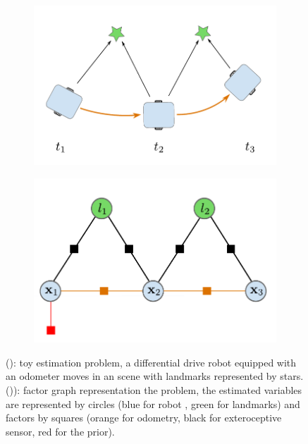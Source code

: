 \begin{figure}[h]
    \centering
    \begin{subfigure}{.49\linewidth}
        \centering
        \includegraphics[width=\textwidth]{figures/toy_example.pdf}
        \caption{\label{fig:toy_problem}}
    \end{subfigure}%
    \hfill
    \begin{subfigure}{.49\linewidth}
        \centering
        \includegraphics[width=\textwidth]{figures/toy_factor.pdf}
        \caption{\label{fig:toy_factor}}
    \end{subfigure}%
    \caption{(): toy estimation problem, a differential drive robot equipped with an odometer moves in 
    an scene with landmarks represented by stars. ()): factor graph representation the problem, the estimated variables are represented by circles 
    (blue for robot \keyframes, green for landmarks) and factors by squares (orange for odometry, black for exteroceptive sensor, red for the prior).}
\end{figure}

